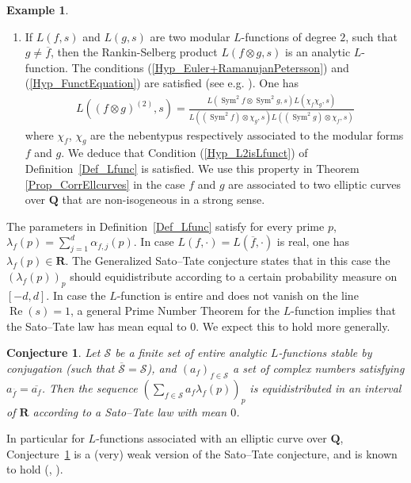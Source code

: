 \documentclass[a4paper,10pt]{amsart}
\theoremstyle{plain}
\newtheorem{conj}{Conjecture}
\theoremstyle{definition}
\newtheorem{ex}{Example}
\begin{document}
\begin{ex}
\begin{enumerate}
		\item\label{Ex_Lfunc_RankinSelberg} If $L(f,s)$ and $L(g,s)$ are two modular $L$-functions of degree $2$, such that $g\neq \overline{f}$, 
		then the  Rankin-Selberg product $L(f\otimes g,s)$ is an analytic $L$-function.
		The conditions (\ref{Hyp_Euler+RamanujanPetersson}) and (\ref{Hyp_FunctEquation}) are satisfied (see e.g. \cite[Th.2.3]{CogdellPS}).
		One has 
		\begin{align*}
        L((f\otimes g)^{(2)},s) = \frac{L(\operatorname{Sym}^{2}f\otimes \operatorname{Sym}^{2}g,s) 
        L(\chi_{f}\chi_{g},s)}{L((\operatorname{Sym}^{2}f)\otimes      \chi_{g},s)L((\operatorname{Sym}^{2}g)\otimes\chi_{f},s)}
        \end{align*}
        where $\chi_{f}$, $\chi_{g}$ are the nebentypus respectively associated to the modular forms $f$ and $g$.
		We deduce that Condition (\ref{Hyp_L2isLfunct}) of Definition~\ref{Def_Lfunc} is satisfied.
		We use this property in Theorem \ref{Prop_CorrEllcurves} in the case $f$ and $g$ are associated to two elliptic curves over $\mathbf{Q}$ that are non-isogeneous in a strong sense.
	\end{enumerate}
	
\end{ex}

The parameters in Definition~\ref{Def_Lfunc} satisfy
for every prime $p$, $\lambda_{f}(p)=\sum_{j=1}^{d}\alpha_{f,j}(p)$.
In case $L(f,\cdot)=L(\overline{f},\cdot)$ is real, one has $\lambda_{f}(p)\in\mathbf{R}$.
The Generalized Sato--Tate conjecture states that in this case the $(\lambda_{f}(p))_{p}$ should equidistribute 
according to a certain probability measure on $[-d,d]$.
In case the $L$-function is entire and does not vanish on the line $\operatorname{Re}(s) =1$, 
a general Prime Number Theorem for the $L$-function implies 
that the Sato--Tate law has mean equal to $0$.
We expect this to hold more generally.

\begin{conj}\label{Sato-Tate} 
Let $\mathcal{S}$ be a finite set of entire analytic $L$-functions stable by conjugation (such that $\overline{\mathcal{S}}=\mathcal{S}$), 
and $(a_{f})_{f\in \mathcal{S}}$ a set of complex numbers satisfying $a_{\overline{f}}= \overline{a_{f}}$.
Then the sequence $(\sum_{f\in\mathcal{S}}a_{f}\lambda_{f}(p))_{p}$ is equidistributed in an interval of $\mathbf{R}$ 
according to a Sato--Tate law with mean $0$.
\end{conj}

In particular for $L$-functions associated with an elliptic curve over $\mathbf{Q}$, 
Conjecture~\ref{Sato-Tate} is a (very) weak version of the Sato--Tate conjecture, and is known to hold (\cite{CHT_SatoTate}, \cite{HSBT_SatoTate}).
\end{document}
